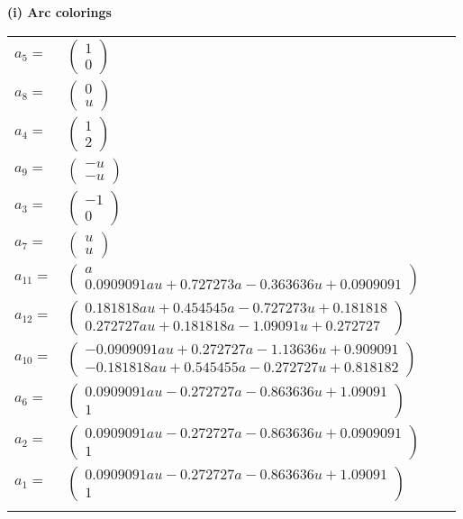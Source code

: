 \documentclass[1p]{elsarticle_modified}
\theoremstyle{definition}
\begin{document}
\flushleft \textbf{(i) Arc colorings}\\
\begin{tabular}{m{7pt} m{180pt} m{7pt} m{180pt} }
\flushright $a_{5}=$&$\begin{pmatrix}1\\0\end{pmatrix}$ \\
\flushright $a_{8}=$&$\begin{pmatrix}0\\u\end{pmatrix}$ \\
\flushright $a_{4}=$&$\begin{pmatrix}1\\2\end{pmatrix}$ \\
\flushright $a_{9}=$&$\begin{pmatrix}- u\\- u\end{pmatrix}$ \\
\flushright $a_{3}=$&$\begin{pmatrix}-1\\0\end{pmatrix}$ \\
\flushright $a_{7}=$&$\begin{pmatrix}u\\u\end{pmatrix}$ \\
\flushright $a_{11}=$&$\begin{pmatrix}a\\0.0909091 a u+0.727273 a-0.363636 u+0.0909091\end{pmatrix}$ \\
\flushright $a_{12}=$&$\begin{pmatrix}0.181818 a u+0.454545 a-0.727273 u+0.181818\\0.272727 a u+0.181818 a-1.09091 u+0.272727\end{pmatrix}$ \\
\flushright $a_{10}=$&$\begin{pmatrix}-0.0909091 a u+0.272727 a-1.13636 u+0.909091\\-0.181818 a u+0.545455 a-0.272727 u+0.818182\end{pmatrix}$ \\
\flushright $a_{6}=$&$\begin{pmatrix}0.0909091 a u-0.272727 a-0.863636 u+1.09091\\1\end{pmatrix}$ \\
\flushright $a_{2}=$&$\begin{pmatrix}0.0909091 a u-0.272727 a-0.863636 u+0.0909091\\1\end{pmatrix}$ \\
\flushright $a_{1}=$&$\begin{pmatrix}0.0909091 a u-0.272727 a-0.863636 u+1.09091\\1\end{pmatrix}$\\&\end{tabular}
\end{document}
